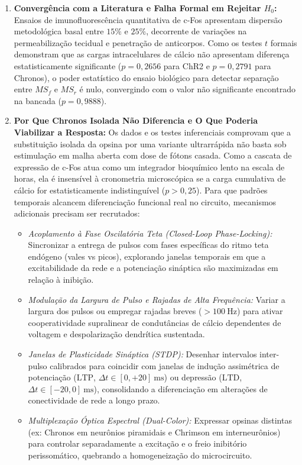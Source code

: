 \documentclass[11pt,a4paper,article,brazil]{abntex2}
\begin{document}
\begin{enumerate}
    \item \textbf{Convergência com a Literatura e Falha Formal em Rejeitar $H_0$:} Ensaios de imunofluorescência quantitativa de c-Fos apresentam dispersão metodológica basal entre $15\%$ e $25\%$, decorrente de variações na permeabilização tecidual e penetração de anticorpos. Como os testes $t$ formais demonstram que as cargas intracelulares de cálcio não apresentam diferença estatisticamente significante ($p = 0{,}2656$ para ChR2 e $p = 0{,}2791$ para Chronos), o poder estatístico do ensaio biológico para detectar separação entre $MS_f$ e $MS_r$ é nulo, convergindo com o valor não significante encontrado na bancada ($p = 0{,}9888$).
    \item \textbf{Por Que Chronos Isolada Não Diferencia e O Que Poderia Viabilizar a Resposta:} Os dados e os testes inferenciais comprovam que a substituição isolada da opsina por uma variante ultrarrápida não basta sob estimulação em malha aberta com dose de fótons casada. Como a cascata de expressão de c-Fos atua como um integrador bioquímico lento na escala de horas, ela é insensível à cronometria microscópica se a carga cumulativa de cálcio for estatisticamente indistinguível ($p > 0{,}25$). Para que padrões temporais alcancem diferenciação funcional real no circuito, mecanismos adicionais precisam ser recrutados:
          \begin{itemize}
              \item \emph{Acoplamento à Fase Oscilatória Teta (Closed-Loop Phase-Locking):} Sincronizar a entrega de pulsos com fases específicas do ritmo teta endógeno (vales vs picos), explorando janelas temporais em que a excitabilidade da rede e a potenciação sináptica são maximizadas em relação à inibição.
              \item \emph{Modulação da Largura de Pulso e Rajadas de Alta Frequência:} Variar a largura dos pulsos ou empregar rajadas breves ($> \qty{100}{\hertz}$) para ativar cooperatividade supralinear de condutâncias de cálcio dependentes de voltagem e despolarização dendrítica sustentada.
              \item \emph{Janelas de Plasticidade Sináptica (STDP):} Desenhar intervalos inter-pulso calibrados para coincidir com janelas de indução assimétrica de potenciação ($\text{LTP}$, $\Delta t \in [0, +20]\ \unit{\milli\second}$) ou depressão ($\text{LTD}$, $\Delta t \in [-20, 0]\ \unit{\milli\second}$), consolidando a diferenciação em alterações de conectividade de rede a longo prazo.
              \item \emph{Multiplexação Óptica Espectral (Dual-Color):} Expressar opsinas distintas (ex: Chronos em neurônios piramidais e Chrimson em interneurônios) para controlar separadamente a excitação e o freio inibitório perissomático, quebrando a homogeneização do microcircuito.
          \end{itemize}
\end{enumerate}
\end{document}
